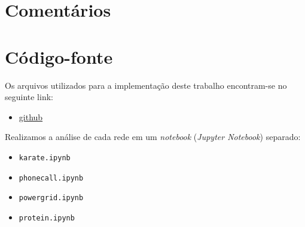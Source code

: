 \documentclass[12pt,a4paper]{article}
\begin{document}
	
	
	\section{Comentários}
	
	\section{Código-fonte}
	
	Os arquivos utilizados para a implementação deste trabalho encontram-se no seguinte link:
	\begin{itemize}
		\item \url{github}
	\end{itemize}
	
	Realizamos a análise de cada rede em um \textit{notebook} (\textit{Jupyter Notebook}) separado:
	
	\begin{itemize}
		\item \texttt{karate.ipynb}
		\item \texttt{phonecall.ipynb}
		\item \texttt{powergrid.ipynb}
		\item \texttt{protein.ipynb}
	\end{itemize} 
	
	
	
\end{document}
